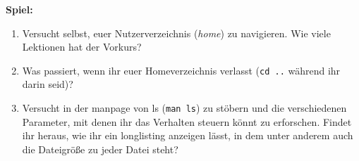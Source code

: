 \textbf{Spiel:}
\begin{enumerate}
    \item Versucht selbst, euer Nutzerverzeichnis (\emph{home}) zu navigieren.
        Wie viele Lektionen hat der Vorkurs?
    \item Was passiert, wenn ihr euer Homeverzeichnis verlasst (\texttt{cd ..}
        während ihr darin seid)?
    \item Versucht in der manpage von ls (\texttt{man ls}) zu stöbern und die
        verschiedenen Parameter, mit denen ihr das Verhalten steuern könnt zu
        erforschen. Findet ihr heraus, wie ihr ein longlisting anzeigen lässt,
        in dem unter anderem auch die Dateigröße zu jeder Datei steht?
\end{enumerate}
